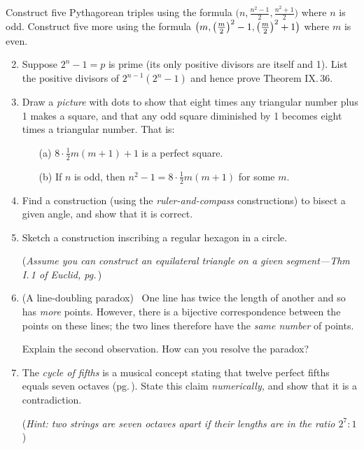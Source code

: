 \begin{exercises}{}{}
	\exstart %
	Construct five Pythagorean triples using the formula $\bigl(n,\frac{n^2-1}2,\frac{n^2+1}2\bigr)$ where $n$ is odd. Construct five more using the formula $\bigl(m,\left(\frac{m}{2}\right)^2-1,\left(\frac{m}{2}\right)^2+1\bigr)$ where $m$ is even.%
	
	\begin{enumerate}\setcounter{enumi}{1}
	  \item Suppose $2^n-1=p$ is prime (its only positive divisors are itself and 1). List the positive divisors of $2^{n-1}(2^n-1)$ and hence prove Theorem IX.\,36.
	  
	  \item%
	  Draw a \emph{picture} with dots to show that eight times any triangular number plus 1 makes a square, and that any odd square diminished by 1 becomes eight times a triangular number. That is:
	  \begin{enumerate}
	    \item[(a)] $8\cdot\frac 12m(m+1)+1$ is a perfect square.
	    \item[(b)] If $n$ is odd, then $n^2-1=8\cdot\frac 12m(m+1)$ for some $m$.
	  \end{enumerate}
	  
	  \item%
	  Find a construction (using the \emph{ruler-and-compass} constructions) to bisect a given angle, and show that it is correct.
	 
	  \item%
	  Sketch a construction inscribing a regular hexagon in a circle.\par
	  (\emph{Assume you can construct an equilateral triangle on a given segment---Thm I.\,1 of Euclid, pg.\,\pageref{pg:euclidI1}})
	  
		\item (A line-doubling paradox) \ One line has twice the length of another and so has \emph{more} points. However, there is a bijective correspondence between the points on these lines; the two lines therefore have the \emph{same number} of points.\par
		Explain the second observation. How can you resolve the paradox?
	
	
		\item The \emph{cycle of fifths} is a musical concept stating that twelve perfect fifths equals seven octaves (pg.\,\pageref{pg:pythagtuning}). State this claim \emph{numerically,} and show that it is a contradiction.\par
		(\emph{Hint: two strings are seven octaves apart if their lengths are in the ratio $2^7:1$})
		

\end{enumerate}
\end{exercises}
